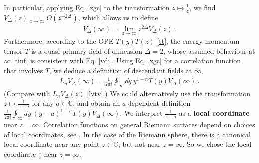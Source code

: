 \documentclass[12pt, a4paper]{article}
\newcommand{\myindex}[1]{\textbf{\boldmath #1}}
\theoremstyle{break}
\begin{document}
In particular, applying Eq. \eqref{zgc} to the transformation $z\mapsto \frac{1}{z}$, we find $V_\Delta(z)\underset{z\to\infty}{=} O(z^{-2\Delta})$, which allows us to define 
\begin{align}
 V_\Delta(\infty) = \lim_{z\to\infty} z^{2\Delta}V_\Delta(z)\ . 
 \label{vdi}
\end{align}
Furthermore, 
according to the OPE $T(y)T(z)$ \eqref{tt}, the energy-momentum tensor $T$ is a quasi-primary field of dimension $\Delta=2$, whose assumed behaviour at $\infty$ \eqref{tinf} is consistent with Eq. \eqref{vdi}. 
Using Eq. \eqref{zgc} for a correlation function that involves $T$, we deduce a definition of descendant fields at $\infty$, 
\begin{align}
 L_n V_\Delta(\infty) = \frac{1}{2\pi i} \oint_\infty dy\ y^{1-n} T(y)V_\Delta(\infty)\ .
 \label{lnia}
\end{align}
(Compare with $L_nV_\Delta(z)$ \eqref{lvtv}.) 
We could alternatively use the transformation $z\mapsto \frac{1}{z-a}$ for any $a\in\mathbb{C}$, and obtain an $a$-dependent definition $ \frac{1}{2\pi i} \oint_\infty dy\ (y-a)^{1-n} T(y)V_\Delta(\infty)$. 
We interpret $\frac{1}{z-a}$ as a \myindex{local coordinate} near $z=\infty$. Correlation functions on general Riemann surfaces depend on choices of local coordinates, see \cite[Section 6.2]{br21}. In the case of the Riemann sphere, there is 
a canonical local coordinate near any point $z\in\mathbb{C}$, but not near $z=\infty$. So we chose the local coordinate $\frac{1}{z}$ near $z=\infty$. 
\end{document}
